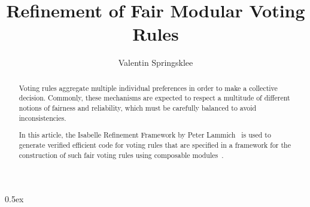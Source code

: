 \documentclass[11pt,a4paper,notitlepage]{report}
\begin{document}
\title{Refinement of Fair Modular Voting Rules}
\author{Valentin Springsklee}
\maketitle

\begin{abstract}
Voting rules aggregate multiple individual preferences in order to make a
collective decision.
Commonly, these mechanisms are expected to respect a multitude of different
notions of fairness and reliability, which must be carefully balanced to avoid
inconsistencies.

In this article, the Isabelle Refinement Framework by Peter Lammich~\cite{Refine_Monadic-AFP} 
is used to generate verified efficient code for voting rules that are specified 
in a framework for the construction of such fair voting rules using composable modules~\cite{adt2019,lopstr2019}.

\end{abstract}

\tableofcontents

\parindent 0pt\parskip 0.5ex





\end{document}

